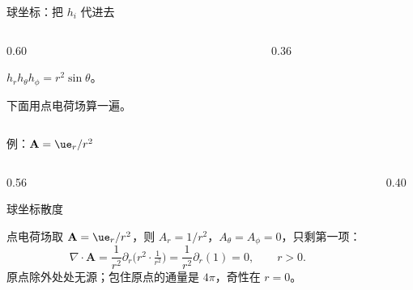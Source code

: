 \documentclass[fontset=windows, chinese, 10pt, xcolor=dvipsnames]{beamer}
\begin{document}
\begin{frame}{球坐标：把 $h_i$ 代进去}
  \begin{columns}[c]
    \begin{column}{0.60\textwidth}
      {\small
      $h_r h_{\theta}h_{\phi}=r^2\sin\theta$。
      \par\smallskip
      \par\smallskip
      下面用点电荷场算一遍。}
    \end{column}
    \begin{column}{0.36\textwidth}
      \centering
      \scalebox{0.72}{}
    \end{column}
  \end{columns}
\end{frame}

\begin{frame}{例：$\mathbf{A}=\ue_r/r^2$}
  \begin{columns}[T]
    \begin{column}{0.56\textwidth}
      {\small
      球坐标散度
      \par\smallskip
      \par\smallskip
      点电荷场取 $\mathbf{A}=\ue_r/r^2$，则
      $A_r=1/r^2$，$A_{\theta}=A_{\phi}=0$，只剩第一项：
      \begin{equation*}
        \nabla\cdot\mathbf{A}
        =\frac{1}{r^2}\partial_r\bigl(r^2\cdot\tfrac{1}{r^2}\bigr)
        =\frac{1}{r^2}\partial_r(1)
        =0,
        \qquad r>0.
      \end{equation*}
      原点除外处处无源；包住原点的通量是 $4\pi$，奇性在 $r=0$。}
    \end{column}
    \begin{column}{0.40\textwidth}
      \centering
      \vspace{1.2em}
      \scalebox{0.82}{}
    \end{column}
  \end{columns}
\end{frame}
\end{document}
